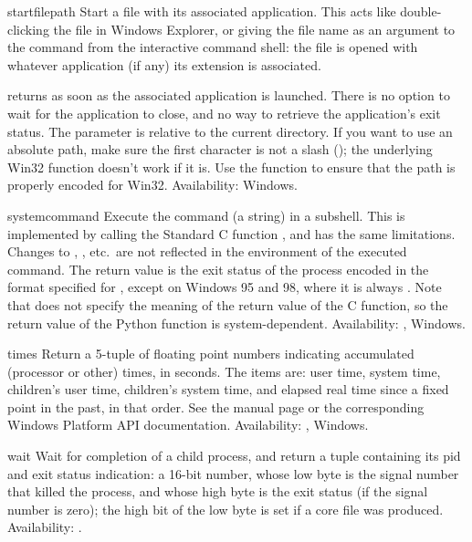 \begin{funcdesc}{startfile}{path}
Start a file with its associated application.  This acts like
double-clicking the file in Windows Explorer, or giving the file name
as an argument to the  command from the interactive
command shell: the file is opened with whatever application (if any)
its extension is associated.

 returns as soon as the associated application
is launched.  There is no option to wait for the application to close,
and no way to retrieve the application's exit status.  The 
parameter is relative to the current directory.  If you want to use an
absolute path, make sure the first character is not a slash
(\character{/}); the underlying Win32 
function doesn't work if it is.  Use the 
function to ensure that the path is properly encoded for Win32.
Availability: Windows.
\end{funcdesc}

\begin{funcdesc}{system}{command}
Execute the command (a string) in a subshell.  This is implemented by
calling the Standard C function , and has the
same limitations.  Changes to , ,
etc.\ are not reflected in the environment of the executed command.
The return value is the exit status of the process encoded in the
format specified for , except on Windows 95 and 98,
where it is always .  Note that \POSIX{} does not specify the
meaning of the return value of the C  function,
so the return value of the Python function is system-dependent.
Availability: \UNIX, Windows.
\end{funcdesc}

\begin{funcdesc}{times}{}
Return a 5-tuple of floating point numbers indicating accumulated
(processor or other)
times, in seconds.  The items are: user time, system time, children's
user time, children's system time, and elapsed real time since a fixed
point in the past, in that order.  See the \UNIX{} manual page
 or the corresponding Windows Platform API
documentation.
Availability: \UNIX, Windows.
\end{funcdesc}

\begin{funcdesc}{wait}{}
Wait for completion of a child process, and return a tuple containing
its pid and exit status indication: a 16-bit number, whose low byte is
the signal number that killed the process, and whose high byte is the
exit status (if the signal number is zero); the high bit of the low
byte is set if a core file was produced.
Availability: \UNIX.
\end{funcdesc}

